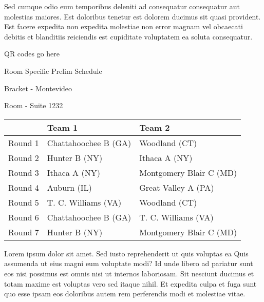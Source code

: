 \documentclass{article}%
\begin{document}
\newline%
Sed cumque odio eum temporibus deleniti ad consequatur consequatur aut molestias maiores. Est doloribus tenetur est dolorem ducimus sit quasi provident. Est facere expedita non expedita molestiae non error magnam vel obcaecati debitis et blanditiis reiciendis est cupiditate voluptatem ea soluta consequatur.%
\vspace*{140pt}%
\begin{center}%
\begin{Huge}%
QR codes go here%
\end{Huge}%
\end{center}%
\newpage%
\begin{center}%
\begin{Huge}%
Room Specific Prelim Schedule%
\end{Huge}%
\vspace*{8pt}%
\linebreak%
\begin{Large}%
Bracket {-} Montevideo%
\end{Large}%
\vspace*{8pt}%
\linebreak%
\vspace*{8pt}%
\begin{Large}%
Room {-} Suite 1232%
\end{Large}%
\end{center}%
%
\begin{tabularx}{\textwidth}{|c|Y|Y|}%
\hline%
&Team 1&Team 2\\%
\hline%
Round 1&Chattahoochee B (GA)&Woodland (CT)\\%
Round 2&Hunter B (NY)&Ithaca A (NY)\\%
Round 3&Ithaca A (NY)&Montgomery Blair C (MD)\\%
Round 4&Auburn (IL)&Great Valley A (PA)\\%
Round 5&T. C. Williams (VA)&Woodland (CT)\\%
Round 6&Chattahoochee B (GA)&T. C. Williams (VA)\\%
Round 7&Hunter B (NY)&Montgomery Blair C (MD)\\%
\hline%
\end{tabularx}%
\vspace*{8pt}%
\newline%
Lorem ipsum dolor sit amet. Sed iusto reprehenderit ut quis voluptas ea Quis assumenda ut eius magni eum voluptate modi? Id unde libero ad pariatur sunt eos nisi possimus est omnis nisi ut internos laboriosam. Sit nesciunt ducimus et totam maxime est voluptas vero sed itaque nihil. Et expedita culpa et fuga sunt quo esse ipsam eos doloribus autem rem perferendis modi et molestiae vitae.\newline%
\end{document}
